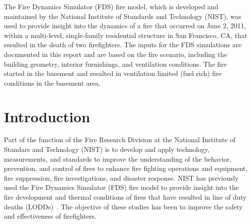 \documentclass[12pt,oneside]{book}
\begin{document}
The Fire Dynamics Simulator (FDS) fire model, which is developed and maintained by the National Institute of Standards and Technology (NIST), was used to provide insight into the dynamics of a fire that occurred on June 2, 2011, within a multi-level, single-family residential structure in San Francisco, CA, that resulted in the death of two firefighters. The inputs for the FDS simulations are documented in this report and are based on the fire scenario, including the building geometry, interior furnishings, and ventilation conditions. The fire started in the basement and resulted in ventilation limited (fuel rich) fire conditions in the basement area.



\chapter{Introduction}
\label{sec:introduction}

Part of the function of the Fire Research Division at the National Institute of Standars and Technology (NIST) is to develop and apply technology, measurements, and standards to improve the understanding of the behavior, prevention, and control of fires to enhance fire fighting operations and equipment, fire suppression, fire investigations, and disaster response. NIST has previously used the Fire Dynamics Simulator (FDS) fire model to provide insight into the fire development and thermal conditions of fires that have resulted in line of duty deaths (LODDs)~\cite{Madrzykowski:1,Iowa,Texas,Bryner:Charleston,barowy:texas,Weinschenk:Chicago}. The objective of these studies has been to improve the safety and effectiveness of firefighters.
\end{document}
